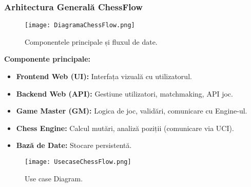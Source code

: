 \documentclass{beamer}
\begin{document}
\begin{frame}
    \frametitle{Arhitectura Generală ChessFlow}
    \begin{figure}
        \centering
        \texttt{[image: DiagramaChessFlow.png]}
        \caption{Componentele principale și fluxul de date.}
    \end{figure}
\end{frame}

\begin {frame}
 \textbf{Componente principale:}
    \begin{itemize}
        \item \textbf{Frontend Web (UI):} Interfața vizuală cu utilizatorul.
        \item \textbf{Backend Web (API):} Gestiune utilizatori, matchmaking, API joc.
        \item \textbf{Game Master (GM):} Logica de joc, validări, comunicare cu Engine-ul.
        \item \textbf{Chess Engine:} Calcul mutări, analiză poziții (comunicare via UCI).
        \item \textbf{Bază de Date:} Stocare persistentă.
    \end{itemize}
\end {frame}

\begin{frame}
\begin{figure}
\centering
\texttt{[image: UsecaseChessFlow.png]}
        \caption{Use case Diagram.}
\end{figure}
\end{frame}
\end{document}
